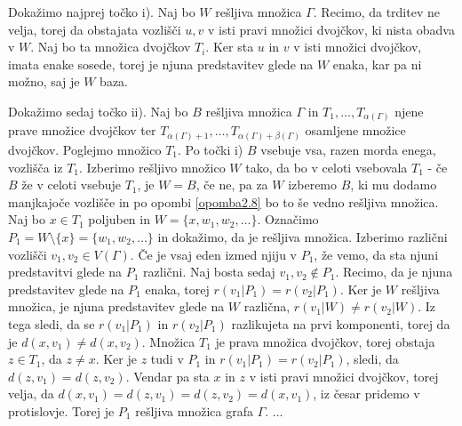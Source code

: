 \documentclass[mat1, tisk]{fmfdelo}
\begin{document}
\begin{dokaz}
  Dokažimo najprej točko i). Naj bo $W$ rešljiva množica $\Gamma$. Recimo, da trditev ne velja, 
  torej da obstajata vozlišči $u,v$ v isti pravi množici dvojčkov, ki nista obadva v $W$. 
  Naj bo ta množica dvojčkov $T_i$. Ker sta $u$ in $v$ v isti množici dvojčkov, 
  imata enake sosede, torej je njuna predstavitev glede na $W$ enaka, kar pa ni 
  možno, saj je $W$ baza.

  Dokažimo sedaj točko ii). Naj bo $B$ rešljiva množica $\Gamma$ in 
  $T_1, \ldots, T_{\alpha(\Gamma)}$ njene prave množice dvojčkov ter 
  $T_{\alpha(\Gamma)+1}, \ldots, T_{\alpha(\Gamma)+\beta(\Gamma)}$ osamljene množice dvojčkov.
  Poglejmo množico $T_1$. 
  Po točki i) $B$ vsebuje vsa, razen morda enega, vozlišča iz $T_1$. Izberimo 
  rešljivo množico $W$ tako, da bo v celoti vsebovala $T_1$ - če $B$ že v celoti vsebuje 
  $T_1$, je $W = B$, če ne, pa za $W$ izberemo $B$, ki mu dodamo manjkajoče vozlišče in po 
  opombi \ref{opomba2.8} bo to še vedno rešljiva množica. Naj bo $x \in T_1$ poljuben in 
  $W = \{x, w_1, w_2, \ldots\}$. Označimo $P_1 = W \setminus \{x\} = \{w_1, w_2, \ldots\}$ 
  in dokažimo, da je rešljiva množica.
  Izberimo različni vozlišči $v_1, v_2 \in V(\Gamma)$. Če je vsaj eden izmed njiju v $P_1$, 
  že vemo, da sta njuni predstavitvi glede na $P_1$ različni. Naj bosta sedaj 
  $v_1, v_2 \notin P_1$. Recimo, da je njuna predstavitev 
  glede na $P_1$ enaka, torej $r(v_1|P_1) = r(v_2|P_1)$. Ker je $W$ rešljiva množica, 
  je njuna predstavitev glede na $W$ različna, $r(v_1|W) \neq r(v_2|W)$. Iz 
  tega sledi, da se $r(v_1|P_1)$ in $r(v_2|P_1)$ razlikujeta na prvi komponenti, 
  torej da je $d(x,v_1) \neq d(x,v_2)$. Množica $T_1$ je prava množica dvojčkov, 
  torej obstaja $z \in T_1 $, da $z \neq x$. Ker je $z$ tudi v $P_1$ in 
  $r(v_1|P_1) = r(v_2|P_1)$, sledi, da $d(z,v_1) = d(z,v_2)$. Vendar pa sta 
  $x$ in $z$ v isti pravi množici dvojčkov, torej velja, da 
  $d(x,v_1) = d(z,v_1) = d(z,v_2) = d(x,v_1)$, iz česar pridemo v protislovje. 
  Torej je $P_1$ rešljiva množica grafa $\Gamma$. 
  ...


\end{dokaz}
\end{document}
